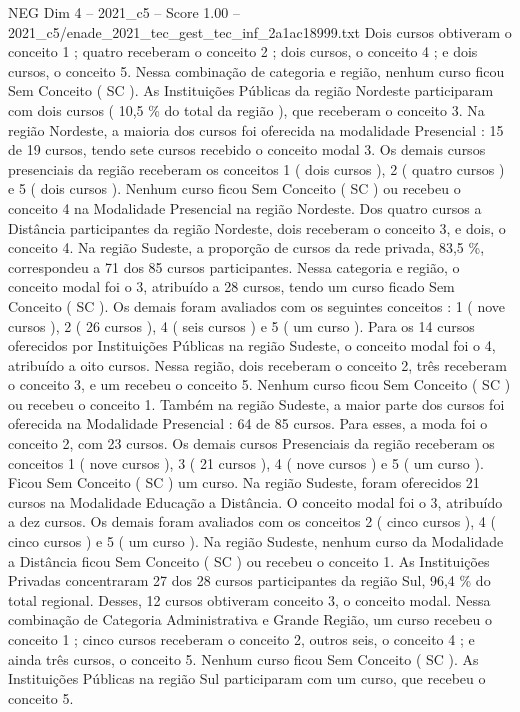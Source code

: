 \begin{textsample}{NEG Dim 4 – 2021\_c5 – Score 1.00 – 2021\_c5/enade\_2021\_tec\_gest\_tec\_inf\_2a1ac18999.txt}
Dois cursos obtiveram o conceito 1 ; quatro receberam o conceito 2 ; dois cursos, o conceito 4 ; e dois cursos, o conceito 5.
Nessa combinação de categoria e região, nenhum curso ficou Sem Conceito ( SC ).
As Instituições Públicas da região Nordeste participaram com dois cursos ( 10,5 \% do total da região ), que receberam o conceito 3.
Na região Nordeste, a maioria dos cursos foi oferecida na modalidade Presencial : 15 de 19 cursos, tendo sete cursos recebido o conceito modal 3.
Os demais cursos presenciais da região receberam os conceitos 1 ( dois cursos ), 2 ( quatro cursos ) e 5 ( dois cursos ).
Nenhum curso ficou Sem Conceito ( SC ) ou recebeu o conceito 4 na Modalidade Presencial na região Nordeste.
Dos quatro cursos a Distância participantes da região Nordeste, dois receberam o conceito 3, e dois, o conceito 4.
Na região Sudeste, a proporção de cursos da rede privada, 83,5 \%, correspondeu a 71 dos 85 cursos participantes.
Nessa categoria e região, o conceito modal foi o 3, atribuído a 28 cursos, tendo um curso ficado Sem Conceito ( SC ).
Os demais foram avaliados com os seguintes conceitos : 1 ( nove cursos ), 2 ( 26 cursos ), 4 ( seis cursos ) e 5 ( um curso ).
Para os 14 cursos oferecidos por Instituições Públicas na região Sudeste, o conceito modal foi o 4, atribuído a oito cursos.
Nessa região, dois receberam o conceito 2, três receberam o conceito 3, e um recebeu o conceito 5.
Nenhum curso ficou Sem Conceito ( SC ) ou recebeu o conceito 1.
Também na região Sudeste, a maior parte dos cursos foi oferecida na Modalidade Presencial : 64 de 85 cursos.
Para esses, a moda foi o conceito 2, com 23 cursos.
Os demais cursos Presenciais da região receberam os conceitos 1 ( nove cursos ), 3 ( 21 cursos ), 4 ( nove cursos ) e 5 ( um curso ).
Ficou Sem Conceito ( SC ) um curso.
Na região Sudeste, foram oferecidos 21 cursos na Modalidade Educação a Distância.
O conceito modal foi o 3, atribuído a dez cursos.
Os demais foram avaliados com os conceitos 2 ( cinco cursos ), 4 ( cinco cursos ) e 5 ( um curso ).
Na região Sudeste, nenhum curso da Modalidade a Distância ficou Sem Conceito ( SC ) ou recebeu o conceito 1.
As Instituições Privadas concentraram 27 dos 28 cursos participantes da região Sul, 96,4 \% do total regional.
Desses, 12 cursos obtiveram conceito 3, o conceito modal.
Nessa combinação de Categoria Administrativa e Grande Região, um curso recebeu o conceito 1 ; cinco cursos receberam o conceito 2, outros seis, o conceito 4 ; e ainda três cursos, o conceito 5.
Nenhum curso ficou Sem Conceito ( SC ).
As Instituições Públicas na região Sul participaram com um curso, que recebeu o conceito 5.

\end{textsample}
